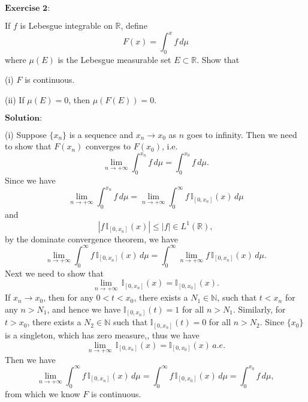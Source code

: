 \documentclass[12pt,a4paper]{ctexart}
\begin{document}
\vspace{8pt}
$\textbf{Exercise 2:}$

If $f$ is Lebesgue integrable on $\mathbb{R}$, define
\begin{equation*}
    F(x) = \int_{0}^{x} f \, d \mu
\end{equation*}
where $\mu(E)$ is the Lebesgue measurable set $E \subset \mathbb{R}$. Show that

(i) $F$ is continuous.

(ii) If $\mu(E) = 0$, then $\mu(F(E)) = 0$. 
 

\vspace{8pt}
$\textbf{Solution:}$

(i) Suppose $\{x_{n}\}$ is a sequence and $x_{n} \to x_{0}$ as $n$ goes to infinity. Then we need to show that $F(x_{n})$ converges to $F(x_{0})$, i.e.
\begin{equation*}
    \lim_{n \to + \infty} \int_{0}^{x_{n}} f \, d \mu = \int_{0}^{x_{0}} f \, d \mu.
\end{equation*}
Since we have
\begin{equation*}
    \lim_{n \to + \infty} \int_{0}^{x_{n}} f \, d \mu = \lim_{n \to + \infty} \int_{0}^{\infty} f \, \mathbb{I}_{[0, x_{n}]} (x) \, d \mu
\end{equation*}
and
\begin{equation*}
    |f \, \mathbb{I}_{[0, x_{n}]} (x) | \leq |f| \in L^{1}(\mathbb{R}),
\end{equation*}
by the dominate convergence theorem, we have
\begin{equation*}
     \lim_{n \to + \infty} \int_{0}^{\infty} f \, \mathbb{I}_{[0, x_{n}]} (x) \, d \mu =  \int_{0}^{\infty}  \lim_{n \to + \infty} f \, \mathbb{I}_{[0, x_{n}]} (x) \, d \mu.
\end{equation*}
Next we need to show that
\begin{equation*}
    \lim_{n \to + \infty} \, \mathbb{I}_{[0, x_{n}]} (x) = \mathbb{I}_{[0, x_{0}]} (x).
\end{equation*}
If $x_{n} \to x_{0}$, then for any $0 < t < x_{0}$, there exists a $N_{1} \in \mathbb{N}$, such that $t < x_{n}$ for any $n > N_{1}$, and hence we have $\mathbb{I}_{[0, x_{n}]} (t) = 1$ for all $n > N_{1}$. Similarly, for $t > x_{0}$, there exists a $N_{2} \in \mathbb{N}$ such that $\mathbb{I}_{[0, x_{n}]} (t) = 0$ for all $n > N_{2}$. Since $\{x_{0}\}$ is a singleton, which has zero measure,, thus we have 
\begin{equation*}
    \lim_{n \to + \infty} \, \mathbb{I}_{[0, x_{n}]} (x) = \mathbb{I}_{[0, x_{0}]} (x) \, a.e.
\end{equation*}
Then we have
\begin{equation*}
     \lim_{n \to + \infty} \int_{0}^{\infty} f \, \mathbb{I}_{[0, x_{n}]} (x) \, d \mu =  \int_{0}^{\infty} f \, \mathbb{I}_{[0, x_{0}]} (x) \, d \mu = \int_{0}^{x_{0}} f \, d \mu,
\end{equation*}
from which we know $F$ is continuous.
\end{document}
